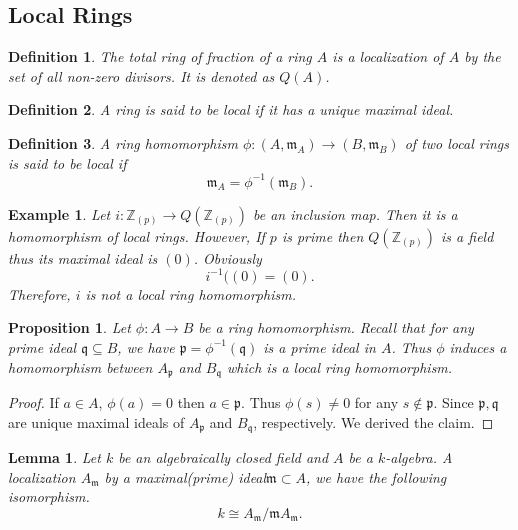 \documentclass{article}
\newtheorem{proposition}{Proposition}[section]
\newtheorem{definition}{Definition}[section]
\newtheorem{lemma}{Lemma}[section]
\newtheorem{example}{Example}[section]
\numberwithin{equation}{section}
\begin{document}
\subsection{Local Rings}

\begin{definition}
The total ring of fraction of a ring $A$ is a localization of $A$ by the set of all non-zero divisors. It is denoted as $Q(A)$.
\end{definition}

\begin{definition}
A ring is said to be local if it has a unique maximal ideal.
\end{definition}

\begin{definition}
A ring homomorphism $\phi:(A,\mathfrak{m}_A)\to (B,\mathfrak{m}_B)$ of two local rings is said to be local if 
\begin{equation*}
\mathfrak{m}_A = \phi^{-1}(\mathfrak{m}_B).
\end{equation*}
\end{definition}

\begin{example}
Let $i:\mathbb{Z}_{(p)}\to Q(\mathbb{Z}_{(p)})$ be an inclusion map. Then it is a homomorphism of local rings. However, If $p$ is prime then $Q(\mathbb{Z}_{(p)})$ is a field thus its maximal ideal is $(0)$. Obviously
\begin{equation*}
i^{-1}((0) = (0).
\end{equation*}
Therefore, $i$ is not a local ring homomorphism.
\end{example}

\begin{proposition}
Let $\phi:A\to B$ be a ring homomorphism. Recall that for any prime ideal $\mathfrak{q}\subseteq B$, we have $\mathfrak{p}=\phi^{-1}(\mathfrak{q})$ is a prime ideal in $A$. Thus $\phi$ induces a homomorphism between $A_{\mathfrak{p}}$ and $B_{\mathfrak{q}}$ which is a local ring homomorphism.
\end{proposition}

\begin{proof}
If $a\in A$, $\phi(a)=0$ then $a\in\mathfrak{p}$. Thus $\phi(s)\not=0$ for any $s\not\in\mathfrak{p}$. Since $\mathfrak{p},\mathfrak{q}$ are unique maximal ideals of  $A_{\mathfrak{p}}$ and $B_{\mathfrak{q}}$, respectively. We derived the claim.
\end{proof}

\begin{lemma}
Let $k$ be an algebraically closed field and $A$ be a $k$-algebra. A localization $A_{\mathfrak{m}}$ by a maximal(prime) ideal$\mathfrak{m}\subset A$, we have the following isomorphism.
\begin{equation*}
k\cong A_{\mathfrak{m}}/\mathfrak{m}A_{\mathfrak{m}}.
\end{equation*}
\label{k_algebra_localization}
\end{lemma}
\end{document}
